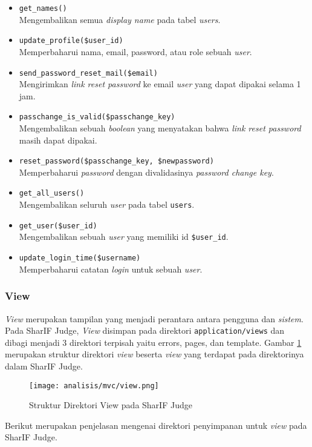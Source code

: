 \begin{itemize}
\begin{itemize}
		      \item \verb|get_names()| \\
		            Mengembalikan semua \textit{display name} pada tabel \textit{users}.
		      \item \verb|update_profile($user_id)| \\
		            Memperbaharui nama, email, password, atau role sebuah \textit{user}.
		      \item \verb|send_password_reset_mail($email)| \\
		            Mengirimkan \textit{link reset password} ke email \textit{user} yang dapat dipakai selama 1 jam.
		      \item \verb|passchange_is_valid($passchange_key)| \\
		            Mengembalikan sebuah \textit{boolean} yang menyatakan bahwa \textit{link reset password} masih dapat dipakai.
		      \item \verb|reset_password($passchange_key, $newpassword)| \\
		            Memperbaharui \textit{password} dengan divalidasinya \textit{password change key}.
		      \item \verb|get_all_users()| \\
		            Mengembalikan seluruh \textit{user} pada tabel \verb|users|.
		      \item \verb|get_user($user_id)| \\
		            Mengembalikan sebuah \textit{user} yang memiliki id \verb|$user_id|.
		      \item \verb|update_login_time($username)| \\
		            Memperbaharui catatan \textit{login} untuk sebuah \textit{user}.
	      \end{itemize}
\end{itemize}

\subsubsection{View}
\label{sub:3:1:1:view}

\textit{View} merupakan tampilan yang menjadi perantara antara pengguna dan \textit{sistem}. Pada SharIF Judge, \textit{View} disimpan pada direktori \verb|application/views| dan dibagi menjadi 3 direktori terpisah yaitu errors, pages, dan template.
Gambar \ref{fig:3:1:1:view} merupakan struktur direktori \textit{view} beserta \textit{view} yang terdapat pada direktorinya dalam SharIF Judge.
\begin{figure}[H]
	\centering
	\texttt{[image: analisis/mvc/view.png]}
	\caption{Struktur Direktori View pada SharIF Judge}
	\label{fig:3:1:1:view}
\end{figure}
Berikut merupakan penjelasan mengenai direktori penyimpanan untuk \textit{view} pada SharIF Judge.

